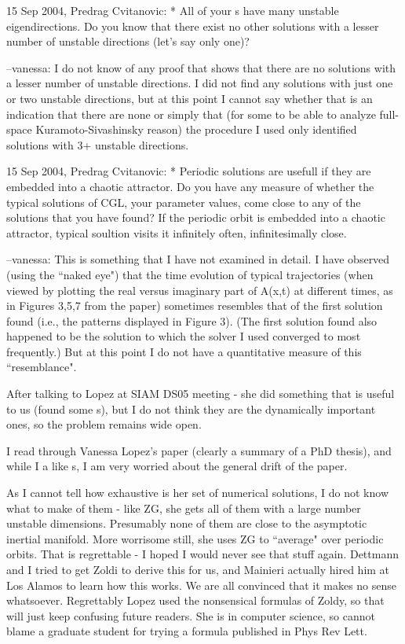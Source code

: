 15 Sep 2004, Predrag Cvitanovic:
* All of your {\Rpo s} have many unstable
eigendirections. Do you know that there exist no other solutions with a
lesser number of unstable directions (let's say only one)?

--vanessa:
I do not know of any proof that shows that there are no solutions with a
lesser number of unstable directions.  I did not find any solutions with
just one or two unstable directions, but at this point I cannot say
whether that is an indication that there are none or simply that (for some
 to
be able to analyze full-space Kuramoto-Sivashinsky 
reason) the procedure I used only identified solutions with 3+ unstable
directions.

15 Sep 2004, Predrag Cvitanovic:
* Periodic solutions are usefull if they are embedded into a chaotic
attractor. Do you have any measure of whether the typical solutions of
CGL, your parameter values, come close to any of the solutions that you
have found? If the periodic orbit is embedded into a chaotic attractor,
typical soultion visits it infinitely often, infinitesimally close.

--vanessa:
This is something that I have not examined in detail.  I have observed (using
the ``naked eye") that the time evolution of typical trajectories (when viewed
by plotting the real versus imaginary part of A(x,t) at different times, as in
Figures 3,5,7 from the paper) sometimes resembles that of the first solution
found (i.e., the patterns displayed in Figure 3). (The first solution
found also happened to be the solution to which the solver I used
converged to most frequently.)  But at this point I do not have a
quantitative measure of this ``resemblance".

After talking to Lopez at SIAM DS05 meeting - she did something that
is useful to us (found some {\rpo s}), but I do not think
they are the dynamically important ones, so the problem remains wide open.

I read through
Vanessa Lopez's paper (clearly a summary of a PhD thesis), and while I
a like {\rpo s}, I am very worried about the general drift
of the paper.

As I cannot tell how exhaustive is her set of numerical solutions, I do
not know what to make of them - like ZG, she gets all of them with a large
number unstable dimensions. Presumably none of them are close to the
asymptotic inertial manifold. More worrisome still, she uses ZG to
``average" over periodic orbits. That is regrettable - I hoped I would
never see that stuff again. Dettmann and I tried to get Zoldi to
derive this for us, and Mainieri actually hired him at Los Alamos to learn
how this works. We are all convinced that it makes no sense whatsoever.
Regrettably Lopez used the nonsensical formulas of Zoldy, so that will
just keep confusing future readers. 
She is in computer science, so cannot
blame a graduate student for trying a formula published in Phys Rev Lett.


